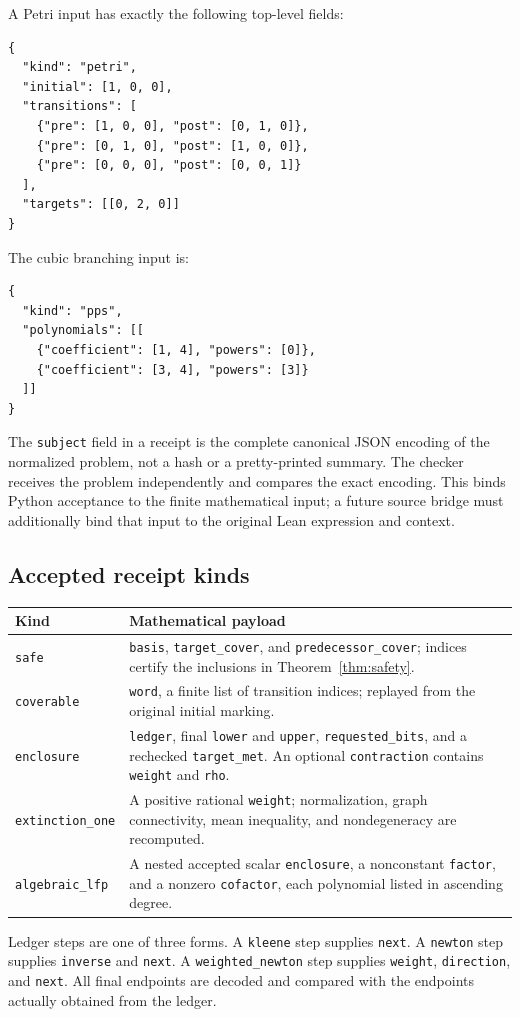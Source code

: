 \documentclass[11pt,a4paper]{article}
\theoremstyle{definition}\newtheorem{definition}[theorem]{Definition}
\theoremstyle{remark}\newtheorem{remark}[theorem]{Remark}
\newcommand{\code}[1]{\nolinkurl{#1}}
\begin{document}
A Petri input has exactly the following top-level fields:
\begin{lstlisting}
{
  "kind": "petri",
  "initial": [1, 0, 0],
  "transitions": [
    {"pre": [1, 0, 0], "post": [0, 1, 0]},
    {"pre": [0, 1, 0], "post": [1, 0, 0]},
    {"pre": [0, 0, 0], "post": [0, 0, 1]}
  ],
  "targets": [[0, 2, 0]]
}
\end{lstlisting}
The cubic branching input is:
\begin{lstlisting}
{
  "kind": "pps",
  "polynomials": [[
    {"coefficient": [1, 4], "powers": [0]},
    {"coefficient": [3, 4], "powers": [3]}
  ]]
}
\end{lstlisting}
The \code{subject} field in a receipt is the complete canonical JSON encoding of the normalized problem, not a hash or a pretty-printed summary. The checker receives the problem independently and compares the exact encoding. This binds Python acceptance to the finite mathematical input; a future source bridge must additionally bind that input to the original Lean expression and context.

\subsection{Accepted receipt kinds}
\begin{longtable}{P{0.22\textwidth}P{0.68\textwidth}}
\toprule
Kind & Mathematical payload \\
\midrule
\code{safe} & \code{basis}, \code{target_cover}, and \code{predecessor_cover}; indices certify the inclusions in Theorem~\ref{thm:safety}.\\[4pt]
\code{coverable} & \code{word}, a finite list of transition indices; replayed from the original initial marking.\\[4pt]
\code{enclosure} & \code{ledger}, final \code{lower} and \code{upper}, \code{requested_bits}, and a rechecked \code{target_met}. An optional \code{contraction} contains \code{weight} and \code{rho}.\\[4pt]
\code{extinction_one} & A positive rational \code{weight}; normalization, graph connectivity, mean inequality, and nondegeneracy are recomputed.\\[4pt]
\code{algebraic_lfp} & A nested accepted scalar \code{enclosure}, a nonconstant \code{factor}, and a nonzero \code{cofactor}, each polynomial listed in ascending degree.\\
\bottomrule
\end{longtable}

Ledger steps are one of three forms. A \code{kleene} step supplies \code{next}. A \code{newton} step supplies \code{inverse} and \code{next}. A \code{weighted_newton} step supplies \code{weight}, \code{direction}, and \code{next}. All final endpoints are decoded and compared with the endpoints actually obtained from the ledger.
\end{document}
